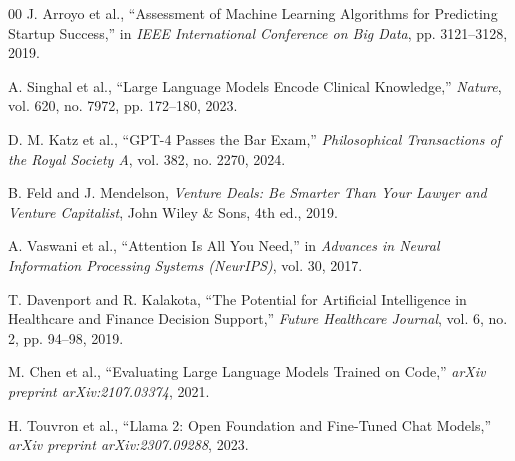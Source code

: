 \documentclass[conference]{IEEEtran}
\begin{document}
\begin{thebibliography}{00}
 J. Arroyo et al., ``Assessment of Machine Learning Algorithms for Predicting Startup Success,'' in \textit{IEEE International Conference on Big Data}, pp. 3121--3128, 2019.

 A. Singhal et al., ``Large Language Models Encode Clinical Knowledge,'' \textit{Nature}, vol. 620, no. 7972, pp. 172--180, 2023.

 D. M. Katz et al., ``GPT-4 Passes the Bar Exam,'' \textit{Philosophical Transactions of the Royal Society A}, vol. 382, no. 2270, 2024.

 B. Feld and J. Mendelson, \textit{Venture Deals: Be Smarter Than Your Lawyer and Venture Capitalist}, John Wiley \& Sons, 4th ed., 2019.

 A. Vaswani et al., ``Attention Is All You Need,'' in \textit{Advances in Neural Information Processing Systems (NeurIPS)}, vol. 30, 2017.

 T. Davenport and R. Kalakota, ``The Potential for Artificial Intelligence in Healthcare and Finance Decision Support,'' \textit{Future Healthcare Journal}, vol. 6, no. 2, pp. 94--98, 2019.

 M. Chen et al., ``Evaluating Large Language Models Trained on Code,'' \textit{arXiv preprint arXiv:2107.03374}, 2021.

 H. Touvron et al., ``Llama 2: Open Foundation and Fine-Tuned Chat Models,'' \textit{arXiv preprint arXiv:2307.09288}, 2023.

\end{thebibliography}
\end{document}

